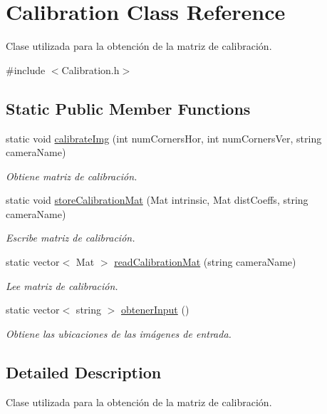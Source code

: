 \hypertarget{classCalibration}{}\section{Calibration Class Reference}
\label{classCalibration}


Clase utilizada para la obtención de la matriz de calibración.  




{\ttfamily \#include $<$Calibration.\+h$>$}

\subsection*{Static Public Member Functions}
\begin{DoxyCompactItemize}
\item 
static void \mbox{\hyperlink{classCalibration_a8e682a5065279297279b6b8ca4c095b6}{calibrate\+Img}} (int num\+Corners\+Hor, int num\+Corners\+Ver, string camera\+Name)
\begin{DoxyCompactList}\small\item\em Obtiene matriz de calibración. \end{DoxyCompactList}\item 
static void \mbox{\hyperlink{classCalibration_af14df4879d8b1c76ff2faa6ede59fc94}{store\+Calibration\+Mat}} (Mat intrinsic, Mat dist\+Coeffs, string camera\+Name)
\begin{DoxyCompactList}\small\item\em Escribe matriz de calibración. \end{DoxyCompactList}\item 
static vector$<$ Mat $>$ \mbox{\hyperlink{classCalibration_a1700229db91e644ab02ace6e27c84a6a}{read\+Calibration\+Mat}} (string camera\+Name)
\begin{DoxyCompactList}\small\item\em Lee matriz de calibración. \end{DoxyCompactList}\item 
static vector$<$ string $>$ \mbox{\hyperlink{classCalibration_aea52dbf7c47bb8be3c28f0b853b76c9d}{obtener\+Input}} ()
\begin{DoxyCompactList}\small\item\em Obtiene las ubicaciones de las imágenes de entrada. \end{DoxyCompactList}\end{DoxyCompactItemize}


\subsection{Detailed Description}
Clase utilizada para la obtención de la matriz de calibración. 

